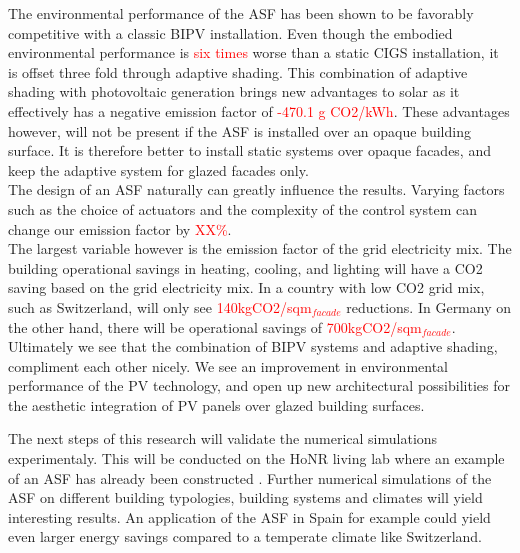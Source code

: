 
The environmental performance of the ASF has been shown to be favorably competitive with a classic BIPV installation. Even though the embodied environmental performance is \textcolor{red}{six times} worse than a static CIGS installation, it is offset three fold through adaptive shading. This combination of adaptive shading with photovoltaic generation brings new advantages to solar as it effectively has a negative emission factor of \textcolor{red}{-470.1 g CO2/kWh}. These advantages however, will not be present if the ASF is installed over an opaque building surface. It is therefore better to install static systems over opaque facades, and keep the adaptive system for glazed facades only. \\

The design of an ASF naturally can greatly influence the results. Varying factors such as the choice of actuators and the complexity of the control system can change our emission factor by \textcolor{red}{XX\%}.\\
The largest variable however is the emission factor of the grid electricity mix. The building operational savings in heating, cooling, and lighting will have a CO2 saving based on the grid electricity mix. In a country with low CO2 grid mix, such as Switzerland, will only see \textcolor{red}{140kgCO2/sqm$_{facade}$} reductions. In Germany on the other hand, there will be operational savings of \textcolor{red}{700kgCO2/sqm$_{facade}$}.\\

Ultimately we see that the combination of BIPV systems and adaptive shading, compliment each other nicely. We see an improvement in environmental performance of the PV technology, and open up new architectural possibilities for the aesthetic integration of PV panels over glazed building surfaces.

The next steps of this research will validate the numerical simulations experimentaly. This will be conducted on the HoNR living lab where an example of an ASF has already been constructed \cite{nagy2015frontiers}. Further numerical simulations of the ASF on different building typologies, building systems and climates will yield interesting results. An application of the ASF in Spain for example could yield even larger energy savings compared to a temperate climate like Switzerland.


